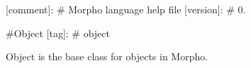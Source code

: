 \mbox{[}comment\mbox{]}\+: \# Morpho language help file \mbox{[}version\mbox{]}\+: \# 0.

\#\+Object \mbox{[}tag\mbox{]}\+: \# object

Object is the base class for objects in Morpho. 